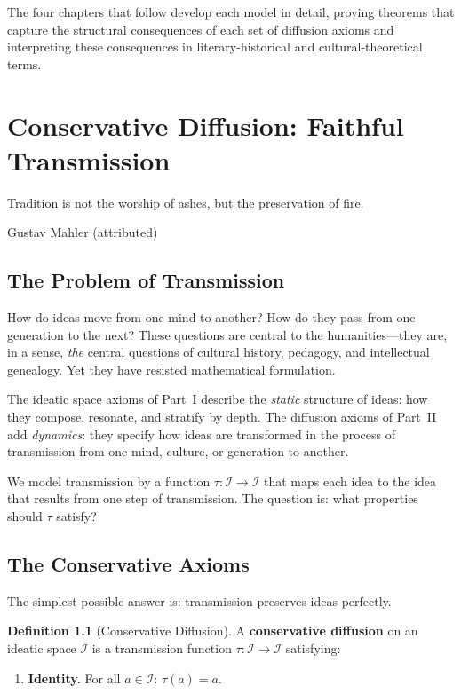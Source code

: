 \documentclass[11pt,openany]{book}
\theoremstyle{definition}
\newtheorem{definition}[axiom]{Definition}
\theoremstyle{plain}
\theoremstyle{remark}
\newcommand{\IS}{\mathcal{I}}               %
\newcommand{\transmit}{\tau}                 %
\begin{document}
The four chapters that follow develop each model in detail, proving theorems that capture the structural consequences of each set of diffusion axioms and interpreting these consequences in literary-historical and cultural-theoretical terms.

\chapter{Conservative Diffusion: Faithful Transmission}
\label{ch:conservative}

\epigraph{Tradition is not the worship of ashes, but the preservation of fire.}{Gustav Mahler (attributed)}

\section{The Problem of Transmission}

How do ideas move from one mind to another? How do they pass from one generation to the next? These questions are central to the humanities---they are, in a sense, \emph{the} central questions of cultural history, pedagogy, and intellectual genealogy. Yet they have resisted mathematical formulation.

The ideatic space axioms of Part~I describe the \emph{static} structure of ideas: how they compose, resonate, and stratify by depth. The diffusion axioms of Part~II add \emph{dynamics}: they specify how ideas are transformed in the process of transmission from one mind, culture, or generation to another.

We model transmission by a function $\transmit : \IS \to \IS$ that maps each idea to the idea that results from one step of transmission. The question is: what properties should $\transmit$ satisfy?

\section{The Conservative Axioms}

The simplest possible answer is: transmission preserves ideas perfectly.

\begin{definition}[Conservative Diffusion]
\label{def:conservative}
A \textbf{conservative diffusion} on an ideatic space $\IS$ is a transmission function $\transmit : \IS \to \IS$ satisfying:
\begin{enumerate}
\item[\textbf{(C1)}] \textbf{Identity.} For all $a \in \IS$: $\transmit(a) = a$.
\end{enumerate}
\end{definition}
\end{document}
